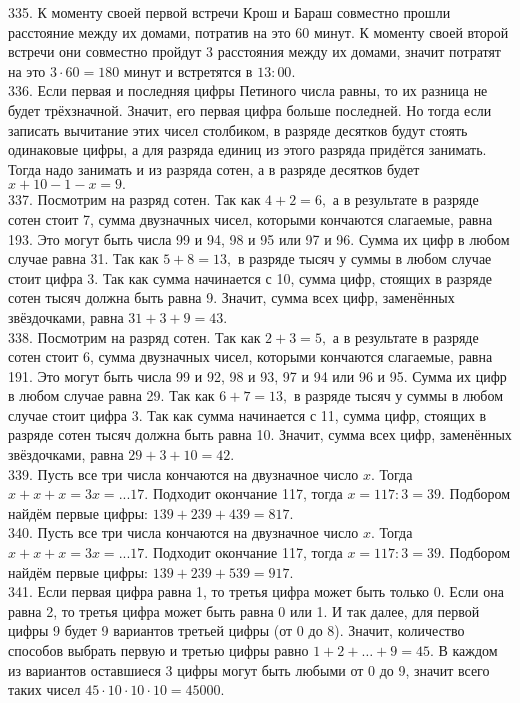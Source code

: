 335. К моменту своей первой встречи Крош и Бараш совместно прошли расстояние между их домами, потратив на это 60 минут. К моменту своей второй встречи они совместно пройдут 3 расстояния между их домами, значит потратят на это $3\cdot60=180$ минут и встретятся в $13:00.$\\
336. Если первая и последняя цифры Петиного числа равны, то их разница не будет трёхзначной. Значит, его первая цифра больше последней. Но тогда если записать вычитание этих чисел столбиком, в разряде десятков будут стоять одинаковые цифры, а для разряда единиц из этого разряда придётся занимать. Тогда надо занимать и из разряда сотен, а в разряде десятков будет $x+10-1-x=9.$\\
337. Посмотрим на разряд сотен. Так как $4+2=6,$ а в результате в разряде сотен стоит 7, сумма двузначных чисел, которыми кончаются слагаемые, равна 193. Это могут быть числа 99 и 94, 98 и 95 или 97 и 96. Сумма их цифр в любом случае равна 31. Так как $5+8=13,$ в разряде тысяч у суммы в любом случае стоит цифра 3. Так как сумма начинается с 10, сумма цифр, стоящих в разряде сотен тысяч должна быть равна 9. Значит, сумма всех цифр, заменённых звёздочками, равна $31+3+9=43.$\\
338. Посмотрим на разряд сотен. Так как $2+3=5,$ а в результате в разряде сотен стоит 6, сумма двузначных чисел, которыми кончаются слагаемые, равна 191. Это могут быть числа 99 и 92, 98 и 93, 97 и 94 или 96 и 95. Сумма их цифр в любом случае равна 29. Так как $6+7=13,$ в разряде тысяч у суммы в любом случае стоит цифра 3. Так как сумма начинается с 11, сумма цифр, стоящих в разряде сотен тысяч должна быть равна 10. Значит, сумма всех цифр, заменённых звёздочками, равна $29+3+10=42.$\\
339. Пусть все три числа кончаются на двузначное число $x.$ Тогда $x+x+x=3x=...17.$ Подходит окончание 117, тогда $x=117:3=39.$ Подбором найдём первые цифры: $139+239+439=817.$\\
340. Пусть все три числа кончаются на двузначное число $x.$ Тогда $x+x+x=3x=...17.$ Подходит окончание 117, тогда $x=117:3=39.$ Подбором найдём первые цифры: $139+239+539=917.$\\
341. Если первая цифра равна 1, то третья цифра может быть только 0. Если она равна 2, то третья цифра может быть равна 0 или 1. И так далее, для первой цифры 9 будет 9 вариантов третьей цифры (от 0 до 8). Значит, количество способов выбрать первую и третью цифры равно $1+2+\ldots+9=45.$ В каждом из вариантов оставшиеся 3 цифры могут быть любыми от 0 до 9, значит всего таких чисел $45\cdot10\cdot10\cdot10=45000.$\\
